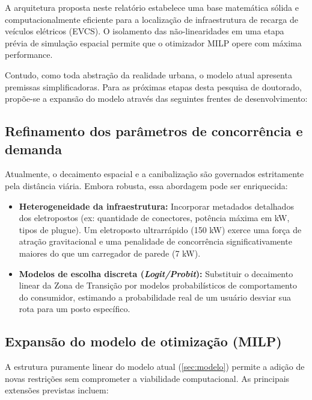 A arquitetura proposta neste relatório estabelece uma base matemática sólida e computacionalmente eficiente para a localização de infraestrutura de recarga de veículos elétricos (EVCS). O isolamento das não-linearidades em uma etapa prévia de simulação espacial permite que o otimizador MILP opere com máxima performance. 

Contudo, como toda abstração da realidade urbana, o modelo atual apresenta premissas simplificadoras. Para as próximas etapas desta pesquisa de doutorado, propõe-se a expansão do modelo através das seguintes frentes de desenvolvimento:

\subsection{Refinamento dos parâmetros de concorrência e demanda}

Atualmente, o decaimento espacial e a canibalização são governados estritamente pela distância viária. Embora robusta, essa abordagem pode ser enriquecida:
\begin{itemize}
    \item \textbf{Heterogeneidade da infraestrutura:} Incorporar metadados detalhados dos eletropostos (ex: quantidade de conectores, potência máxima em kW, tipos de plugue). Um eletroposto ultrarrápido (150 kW) exerce uma força de atração gravitacional e uma penalidade de concorrência significativamente maiores do que um carregador de parede (7 kW).
    \item \textbf{Modelos de escolha discreta (\textit{Logit/Probit}):} Substituir o decaimento linear da Zona de Transição por modelos probabilísticos de comportamento do consumidor, estimando a probabilidade real de um usuário desviar sua rota para um posto específico.
\end{itemize}

\subsection{Expansão do modelo de otimização (MILP)}

A estrutura puramente linear do modelo atual (\ref{sec:modelo}) permite a adição de novas restrições sem comprometer a viabilidade computacional. As principais extensões previstas incluem:

